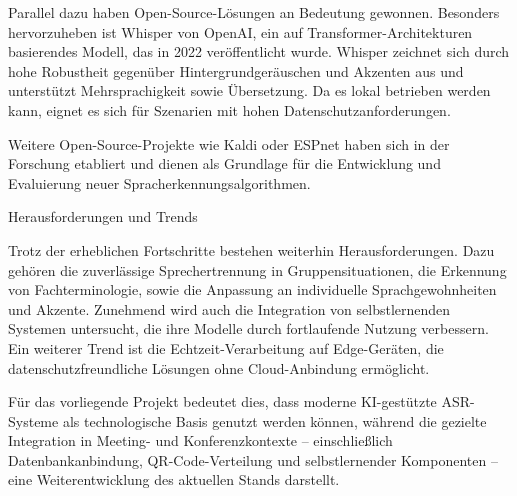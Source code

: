 Parallel dazu haben Open-Source-Lösungen an Bedeutung gewonnen. Besonders hervorzuheben ist Whisper von OpenAI, ein auf Transformer-Architekturen basierendes Modell, das in 2022 veröffentlicht wurde. Whisper zeichnet sich durch hohe Robustheit gegenüber Hintergrundgeräuschen und Akzenten aus und unterstützt Mehrsprachigkeit sowie Übersetzung. Da es lokal betrieben werden kann, eignet es sich für Szenarien mit hohen Datenschutzanforderungen.

Weitere Open-Source-Projekte wie Kaldi oder ESPnet haben sich in der Forschung etabliert und dienen als Grundlage für die Entwicklung und Evaluierung neuer Spracherkennungsalgorithmen.

Herausforderungen und Trends

Trotz der erheblichen Fortschritte bestehen weiterhin Herausforderungen. Dazu gehören die zuverlässige Sprechertrennung in Gruppensituationen, die Erkennung von Fachterminologie, sowie die Anpassung an individuelle Sprachgewohnheiten und Akzente. Zunehmend wird auch die Integration von selbstlernenden Systemen untersucht, die ihre Modelle durch fortlaufende Nutzung verbessern. Ein weiterer Trend ist die Echtzeit-Verarbeitung auf Edge-Geräten, die datenschutzfreundliche Lösungen ohne Cloud-Anbindung ermöglicht.

Für das vorliegende Projekt bedeutet dies, dass moderne KI-gestützte ASR-Systeme als technologische Basis genutzt werden können, während die gezielte Integration in Meeting- und Konferenzkontexte – einschließlich Datenbankanbindung, QR-Code-Verteilung und selbstlernender Komponenten – eine Weiterentwicklung des aktuellen Stands darstellt.
